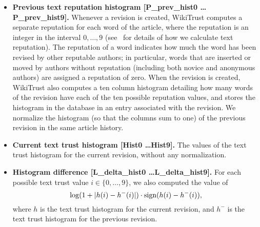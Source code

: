 \begin{itemize}
\item \textbf{Previous text reputation histogram [P\_prev\_hist0 \ldots P\_prev\_hist9].}
Whenever a revision is created, WikiTrust computes a separate reputation
for each word of the article, where the reputation is an
integer in the interval $0, \ldots, 9$ (see~\cite{Adler2008b} for
details of how we calculate text reputation).  The
reputation of a word indicates how much the word has been revised by
other reputable authors; in particular, words that are inserted or
moved by authors without reputation (including both novice and
anonymous authors) are assigned a reputation of zero.  When the revision is
created, WikiTrust also computes a ten column histogram detailing how
many words of the revision have each of the ten possible reputation
values, and stores the histogram in the database in an entry associated
with the revision.
We normalize the histogram (so that
the columns sum to one) of the previous revision in the same article history.

\item \textbf{Current text trust histogram [Hist0 \ldots Hist9].}
The values of the text trust histogram for the current revision,
without any normalization.

\item \textbf{Histogram difference [L\_delta\_hist0 \ldots L\_delta\_hist9].}
For each possible text trust value $i \in \{0, \ldots, 9\}$, we also
computed the value of
\begin{equation}
\log(1 + |h(i) - h^{-}(i)|) \cdot {{\textrm{sign}}}(h(i) -
h^{-}(i)),
\end{equation}
where $h$ is the text trust histogram for the current
revision, and $h^{-}$ is the text trust histogram for the previous
revision.

\end{itemize}
%

